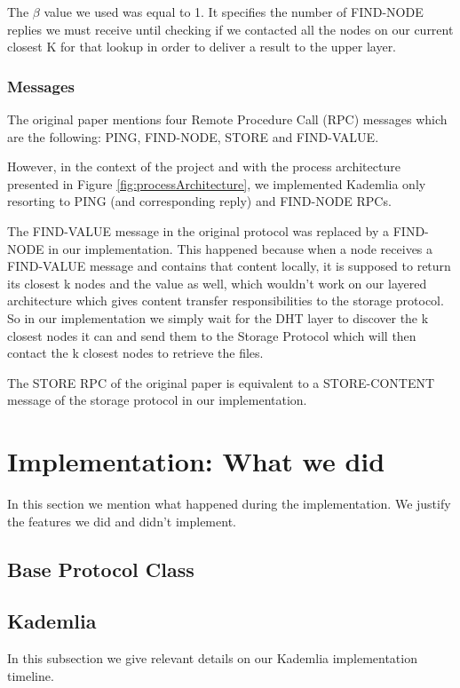 \documentclass[sigconf]{acmart}
\begin{document}
 The $\beta$ value we used was equal to 1. It specifies the number of FIND-NODE replies we must receive until checking if we contacted all the nodes on our current closest K for that lookup in order to deliver a result to the upper layer.
 

\subsubsection{Messages}
The original paper mentions four Remote Procedure Call (RPC) messages which are the following: PING, FIND-NODE, STORE and FIND-VALUE.

However, in the context of the project and with the process architecture presented in Figure \ref{fig:processArchitecture}, we implemented Kademlia only resorting to PING (and corresponding reply) and FIND-NODE RPCs.

The FIND-VALUE message in the original protocol was replaced by a FIND-NODE in our implementation. This happened because when a node receives a FIND-VALUE message and contains that content locally, it is supposed to return its closest k nodes and the value as well, which wouldn't work on our layered architecture which gives content transfer responsibilities to the storage protocol. So in our implementation we simply wait for the DHT layer to discover the k closest nodes it can and send them to the Storage Protocol which will then contact the k closest nodes to retrieve the files.

The STORE RPC of the original paper is equivalent to a STORE-CONTENT message of the storage protocol in our implementation.



\section{Implementation: What we did}
In this section we mention what happened during the implementation. We justify the features we did and didn't implement.

\subsection{Base Protocol Class}

\subsection{Kademlia}
In this subsection we give relevant details on our Kademlia implementation timeline.
\end{document}
